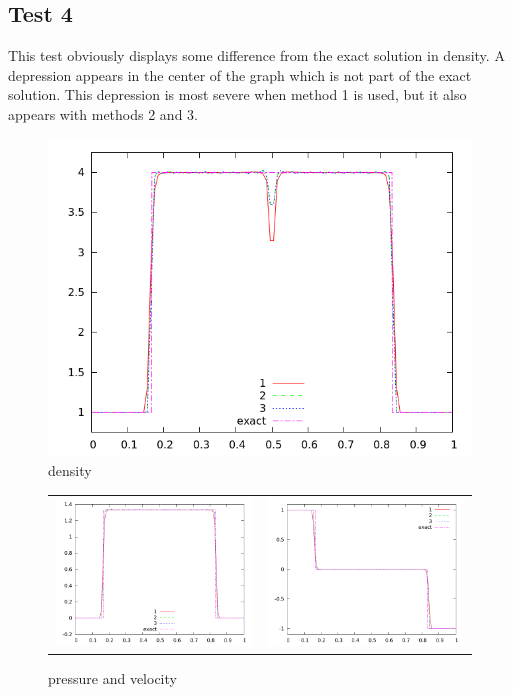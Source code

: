 \documentclass[letterpaper,12pt]{article}
\begin{document}
\clearpage

\subsection{Test 4}

This test obviously displays some difference from the exact solution in density. A depression appears in the center of the graph which is not part of the exact solution. This depression is most severe when method 1 is used, but it also appears with methods 2 and 3. 

\begin{figure}[h]
  \begin{center}
     \includegraphics[width=.78\textwidth]{den_T4.png}	
  \end{center}
  \caption{density}
\end{figure}

\begin{figure}
  \begin{center}
	\begin{tabular}{cc}
      \includegraphics[width=.425\textwidth]{prs_T4.png} &
	  \includegraphics[width=.425\textwidth]{vel_T4.png}
	\end{tabular}
  \end{center}
  \caption{pressure and velocity}
\end{figure}
\end{document}

